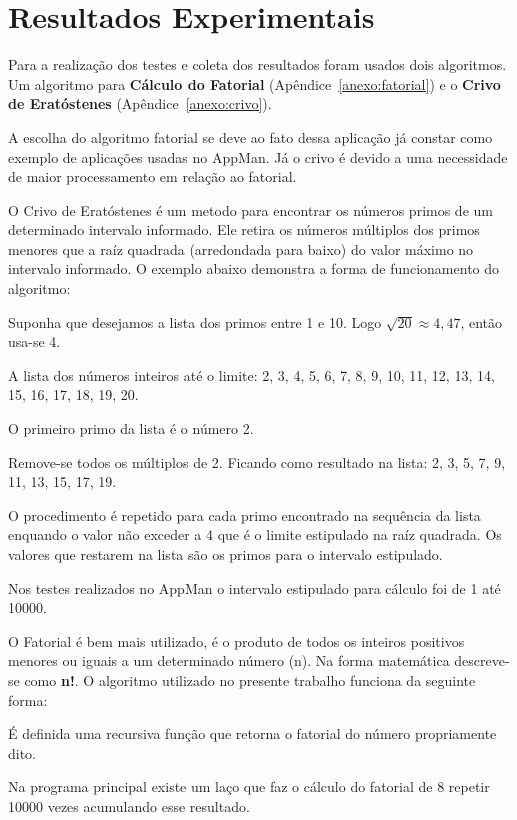 \chapter{Resultados Experimentais}
\label{cap:resultados}

Para a realização dos testes e coleta dos resultados foram usados dois algoritmos. Um algoritmo para \textbf{Cálculo do Fatorial} (Apêndice~\ref{anexo:fatorial}) e o \textbf{Crivo de Eratóstenes} (Apêndice~\ref{anexo:crivo}).

A escolha do algoritmo fatorial se deve ao fato dessa aplicação já constar como exemplo de aplicações usadas no AppMan. Já o crivo é devido a uma necessidade de maior processamento em relação ao fatorial. 

O Crivo de Eratóstenes é um metodo para encontrar os números primos de um determinado intervalo informado. Ele retira os números múltiplos dos primos menores que a raíz quadrada (arredondada para baixo) do valor máximo no intervalo informado. O exemplo abaixo demonstra a forma de funcionamento do algoritmo:

Suponha que desejamos a lista dos primos entre 1 e 10. Logo $\sqrt{20} \approx 4,47$, então usa-se 4. 

A lista dos números inteiros até o limite: 2, 3, 4, 5, 6, 7, 8, 9, 10, 11, 12, 13, 14, 15, 16, 17, 18, 19, 20. 

O primeiro primo da lista é o número 2. 

Remove-se todos os múltiplos de 2. Ficando como resultado na lista: 2, 3, 5, 7, 9, 11, 13, 15, 17, 19.

O procedimento é repetido para cada primo encontrado na sequência da lista enquando o valor não exceder a 4 que é o limite estipulado na raíz quadrada. Os valores que restarem na lista são os primos para o intervalo estipulado.

Nos testes realizados no AppMan o intervalo estipulado para cálculo foi de 1 até 10000.

O Fatorial é bem mais utilizado, é o produto de todos os inteiros positivos menores ou iguais a um determinado número (n). Na forma matemática descreve-se como \textbf{n!}. O algoritmo utilizado no presente trabalho funciona da seguinte forma:

É definida uma recursiva função que retorna o fatorial do número propriamente dito.

Na programa principal existe um laço que faz o cálculo do fatorial de 8 repetir 10000 vezes acumulando esse resultado.

